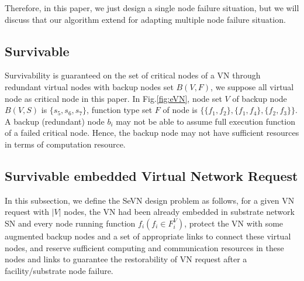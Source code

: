 Therefore, in this paper, we just design a single node failure situation, but we will discuss that our algorithm extend for adapting multiple node failure situation.


\subsection{Survivable}

Survivability is guaranteed on the set of critical nodes of a VN through redundant virtual nodes with backup nodes set $B(V,F)$, we suppose all virtual node as critical node in this paper. In Fig.\ref{fig:eVN}, node set $V$ of backup node $B(V,S)$ is $\{s_5,s_6,s_7\}$, function type set $F$ of node is $\{\{f_1,f_2\},\{f_1,f_4\},\{f_2,f_3\}\}$. A backup (redundant) node $b_i$ may not be able to assume full execution function of a failed critical node. Hence, the backup node may not have sufficient resources in terms of computation resource.





\subsection{Survivable embedded Virtual Network Request}

In this subsection, we define the SeVN design problem as follows, for a given VN request with $|V|$ nodes, the VN had been already embedded in substrate network SN and every node running function $f_i(f_i\in F^V_i)$, protect the VN with some augmented backup nodes and a set of appropriate links to connect these virtual nodes, and reserve sufficient computing and communication resources in these nodes and links to guarantee the restorability of VN request after a facility/substrate node failure.

